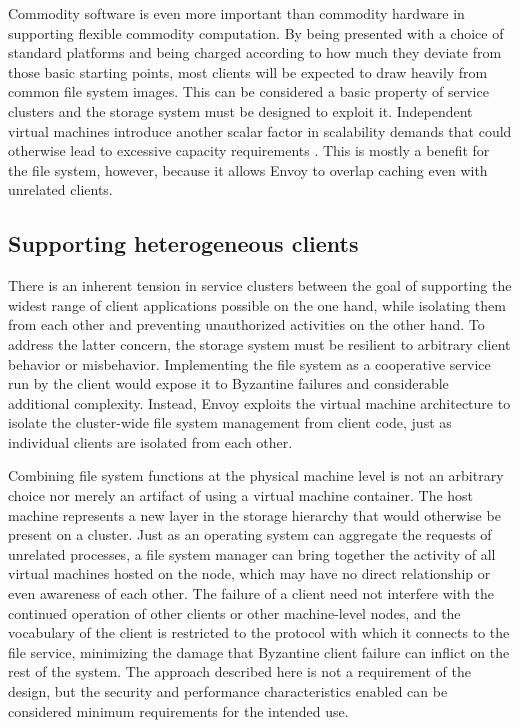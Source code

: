 Commodity software is even more important than commodity hardware in supporting flexible commodity computation. By being presented with a choice of standard platforms and being charged according to how much they deviate from those basic starting points, most clients will be expected to draw heavily from common file system images. This can be considered a basic property of service clusters and the storage system must be designed to exploit it. Independent virtual machines introduce another scalar factor in scalability demands that could otherwise lead to excessive capacity requirements \cite{warfield}. This is mostly a benefit for the file system, however, because it allows Envoy to overlap caching even with unrelated clients.

\subsection{Supporting heterogeneous clients}

There is an inherent tension in service clusters between the goal of supporting the widest range of client applications possible on the one hand, while isolating them from each other and preventing unauthorized activities on the other hand. To address the latter concern, the storage system must be resilient to arbitrary client behavior or misbehavior. Implementing the file system as a cooperative service run by the client would expose it to Byzantine failures and considerable additional complexity. Instead, Envoy exploits the virtual machine architecture to isolate the cluster-wide file system management from client code, just as individual clients are isolated from each other.

Combining file system functions at the physical machine level is not an arbitrary choice nor merely an artifact of using a virtual machine container. The host machine represents a new layer in the storage hierarchy that would otherwise be present on a cluster. Just as an operating system can aggregate the requests of unrelated processes, a file system manager can bring together the activity of all virtual machines hosted on the node, which may have no direct relationship or even awareness of each other. The failure of a client need not interfere with the continued operation of other clients or other machine-level nodes, and the vocabulary of the client is restricted to the protocol with which it connects to the file service, minimizing the damage that Byzantine client failure can inflict on the rest of the system. The approach described here is not a requirement of the design, but the security and performance characteristics enabled can be considered minimum requirements for the intended use.

